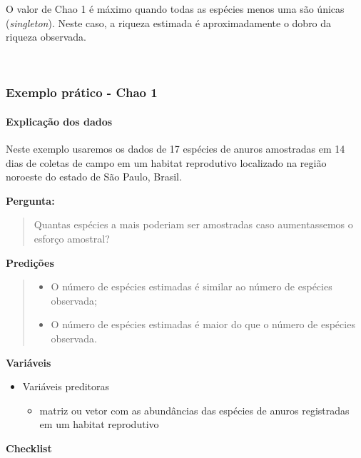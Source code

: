 \documentclass[
]{book}
\providecommand{\tightlist}{%
  \setlength{\itemsep}{0pt}\setlength{\parskip}{0pt}}
\begin{document}
O valor de Chao 1 é máximo quando todas as espécies menos uma são únicas (\emph{singleton}). Neste caso, a riqueza estimada é aproximadamente o dobro da riqueza observada.

~

\hypertarget{exemplo-pruxe1tico---chao-1}{%
\subsubsection{Exemplo prático - Chao 1}\label{exemplo-pruxe1tico---chao-1}}

\hypertarget{explicauxe7uxe3o-dos-dados}{%
\paragraph{Explicação dos dados}\label{explicauxe7uxe3o-dos-dados}}

Neste exemplo usaremos os dados de 17 espécies de anuros amostradas em 14 dias de coletas de campo em um habitat reprodutivo localizado na região noroeste do estado de São Paulo, Brasil.

\textbf{Pergunta:}

\begin{quote}
Quantas espécies a mais poderiam ser amostradas caso aumentassemos o esforço amostral?
\end{quote}

\textbf{Predições}

\begin{quote}
\begin{itemize}
\tightlist
\item
  O número de espécies estimadas é similar ao número de espécies observada;
\item
  O número de espécies estimadas é maior do que o número de espécies observada.
\end{itemize}
\end{quote}

\textbf{Variáveis}

\begin{itemize}
\tightlist
\item
  Variáveis preditoras

  \begin{itemize}
  \tightlist
  \item
    matriz ou vetor com as abundâncias das espécies de anuros registradas em um habitat reprodutivo
  \end{itemize}
\end{itemize}

\textbf{Checklist}
\end{document}
